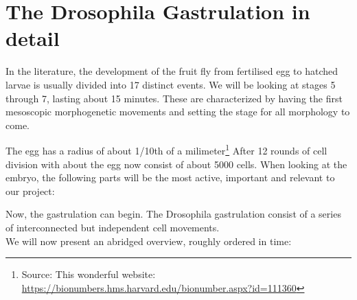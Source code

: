 



\newpage
\section{The Drosophila Gastrulation in detail}
In the literature, the development of the fruit fly from fertilised egg to hatched larvae is usually divided into 17 distinct events.\cite{bownes1975photographic} We will be looking at stages 5 through 7, lasting about 15 minutes. These are characterized by having the first mesoscopic morphogenetic movements and setting the stage for all morphology to come.

The egg has a radius of about 1/10th of a milimeter\footnote{Source: This wonderful website: \url{https://bionumbers.hms.harvard.edu/bionumber.aspx?id=111360}}
After 12 rounds of cell division with about the egg now consist of about 5000 cells. 
When looking at the embryo, the following parts will be the most active, important and relevant to our project:



Now, the gastrulation can begin.
The Drosophila gastrulation consist of a series of interconnected but independent cell movements.\\
We will now present an abridged overview, roughly ordered in time:





